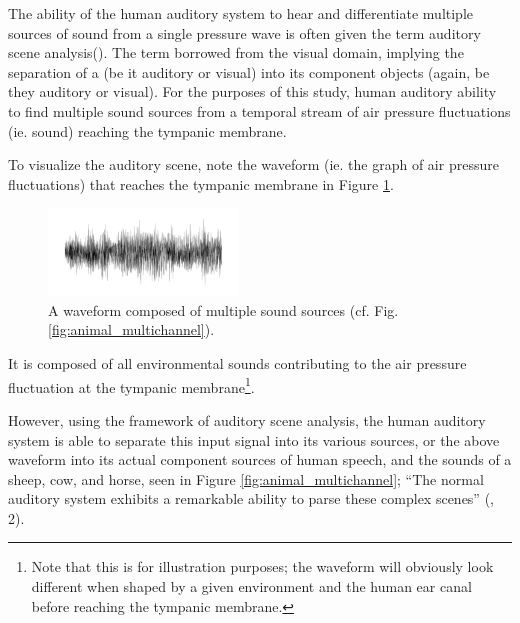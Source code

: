 The ability of the human auditory system to hear and differentiate multiple sources of sound from a single pressure wave is often given the term \DIFdelbegin {}\DIFdelend \DIFaddbegin {}\DIFaddend auditory scene analysis\DIFdelbegin {}\DIFdelend \DIFaddbegin {}\DIFaddend (\cite{bregman:94}).  The term \DIFdelbegin {}\DIFdelend \DIFaddbegin {}\DIFaddend borrowed from the visual domain, implying the separation of a \DIFdelbegin {}\DIFdelend \DIFaddbegin {}\DIFaddend (be it auditory or visual) into its component objects (again, be they auditory or visual). For the purposes of this study, \DIFdelbegin {}\DIFdelend \DIFaddbegin {}\DIFaddend human auditory ability to find multiple sound sources from a temporal stream of air pressure fluctuations (ie. sound) reaching the tympanic membrane.

To visualize the auditory scene, note the waveform (ie. the graph of air pressure fluctuations) that reaches the tympanic membrane in Figure \ref{fig:animal_singlechannel}.  
%
\begin{figure}
\centering
  \includegraphics[width=0.45\textwidth]{figure/single-channel-animals.png}
  \caption{A waveform composed of multiple sound sources (cf. Fig. \ref{fig:animal_multichannel}).}
  \label{fig:animal_singlechannel}
\end{figure}
%
It is composed of all environmental sounds contributing to the air pressure fluctuation at the tympanic membrane\footnote{Note that this is for illustration purposes; the waveform will obviously look different when shaped by a given environment and the human ear canal before reaching the tympanic membrane.}.

However, using the framework of auditory scene analysis, the human auditory system is able to separate this input signal into its various sources, or \DIFdelbegin {}\DIFdelend \DIFaddbegin {}\DIFaddend the above waveform into its actual component sources of human speech, and the sounds of a sheep, cow, and horse, seen in Figure \ref{fig:animal_multichannel}; ``The normal auditory system exhibits a remarkable ability to parse these complex scenes'' (\cite{middlebrooks:17}, 2).

